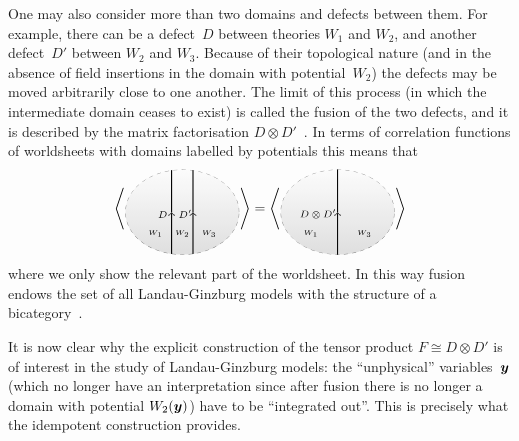 \documentclass{compositio}
\def\nicenocolourscheme{\shadedraw[top color=gray!2, bottom color=gray!25, draw=gray!50!black, dashed]}
\theoremstyle{definition}
\numberwithin{equation}{section}
\begin{document}
One may also consider more than two domains and defects between them. For example, there can be a defect~$D$ between theories $W_{1}$ and $W_{2}$, and another defect~$D'$ between $W_{2}$ and $W_{3}$. Because of their topological nature (and in the absence of field insertions in the domain with potential~$W_{2}$) the defects may be moved arbitrarily close to one another. The limit of this process (in which the intermediate domain ceases to exist) is called the fusion of the two defects, and it is described by the matrix factorisation $D\otimes D'$~\cite{br0707.0922}. In terms of correlation functions of worldsheets with domains labelled by potentials this means that
$$
\left\langle
\begin{tikzpicture}[scale=0.9,baseline]
\clip (0,0) ellipse (1.6cm and 1.2cm);
\draw[step=.5cm,gray,very thin] (-1.4,-1.4) grid (1.4,1.4);
\nicenocolourscheme (0,0) ellipse (1.6cm and 1.2cm);
\draw (-0.55,-0.05) node {{\scriptsize $D\vphantom{D'}$}};
\draw (0.08,-0.05) node {{\scriptsize $D'$}};
\draw[->,thick, color=black] (-0.3,-1.5) -- (-0.3,0);
\draw[->,thick, color=black] (0.3,-1.5) -- (0.3,0);
\draw[thick, color=black] (-0.3,0) -- (-0.3,1.5);
\draw[thick, color=black] (0.3,0) -- (0.3,1.5);
\node (W1) at (-0.75,-0.6) [circle] {{\tiny $W_{1}$}};
\node (W2) at (0,-0.6) [circle] {{\tiny $W_{2}$}};
\node (W3) at (0.75,-0.6) [circle] {{\tiny $W_{3}$}};
\end{tikzpicture}
\right\rangle
=
\left\langle
\begin{tikzpicture}[scale=0.9,baseline]
\clip (0,0) ellipse (1.6cm and 1.2cm);
\draw[step=.5cm,gray,very thin] (-1.4,-1.4) grid (1.4,1.4);
\nicenocolourscheme (0,0) ellipse (1.6cm and 1.2cm);
\draw (-0.55,-0.05) node {{\scriptsize $D\otimes D'$}};
\draw[->,thick, color=black] (0,-1.5) -- (0,0);
\draw[thick, color=black] (0,0) -- (0,1.5);
\node (W1) at (-0.75,-0.6) [circle] {{\tiny $W_{1}$}};
\node (W3) at (0.75,-0.6) [circle] {{\tiny $W_{3}$}};
\end{tikzpicture}
\right\rangle
$$
where we only show the relevant part of the worldsheet. 
In this way fusion endows the set of all Landau-Ginzburg models with the structure of a bicategory~\cite{Calinetal2, McNameethesis, cr0909.4381, cr1006.5609}. 

It is now clear why the explicit construction of the tensor product $F\cong D\otimes D'$ is of interest in the study of Landau-Ginzburg models: the ``unphysical'' variables~$\boldsymbol{y}$ (which no longer have an interpretation since after fusion there is no longer a domain with potential $W_{2}(\boldsymbol{y})$) have to be ``integrated out''. This is precisely what the idempotent construction provides. 
\end{document}
